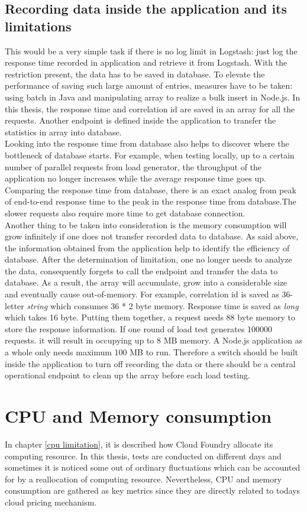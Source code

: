   \subsection{Recording data inside the application and its limitations}
This would be a very simple task if there is no log limit in Logstash: just log the response time recorded in application and retrieve it from Logstash. With the restriction present, the data has to be saved in database. To elevate the performance of saving such large amount of entries, measures have to be taken: using batch in Java and manipulating array to realize a bulk insert in Node.js. In this thesis, the response time and correlation id are saved in an array for all the requests. Another endpoint is defined inside the application to transfer the statistics in array into database.\\
Looking into the response time from database also helps to discover where the bottleneck of database starts. For example, when testing locally, up to a certain number of parallel requests from load generator, the throughput of the application no longer increases while the average response time goes up. Comparing the response time from database, there is an exact analog from peak of end-to-end response time to the peak in the response time from database.The slower requests also require more time to get database connection. \\
Another thing to be taken into consideration is the memory consumption will grow infinitely if one does not transfer recorded data to database. As said above, the information obtained from the application help to identify the efficiency of database. After the determination of limitation, one no longer needs to analyze the data,  consequently forgets to call the endpoint and transfer the data to database. As a result, the array will accumulate, grow into a considerable size and eventually cause out-of-memory. For example, correlation id is saved as 36-letter \textit{string} which consumes 36 * 2 byte memory. Response time is saved as \textit{long} which takes 16 byte. Putting them together, a request needs 88 byte memory to store the response information. If one round of load test generates 100000 requests. it will result in occupying up to 8 MB memory. A Node.js application as a whole only needs maximum 100 MB to run. Therefore a switch should be built inside the application to turn off recording the data or there should be a central operational endpoint to clean up the array before each load testing. 
\section{CPU and Memory consumption}
In chapter \ref{cpu limitation}, it is described how Cloud Foundry allocate its computing resource. In this thesis, tests are conducted on different days and sometimes it is noticed some out of ordinary fluctuations which can be accounted for by a reallocation of computing resource. Nevertheless, CPU and memory consumption are gathered as key metrics since they are directly related to todays cloud pricing mechanism.
